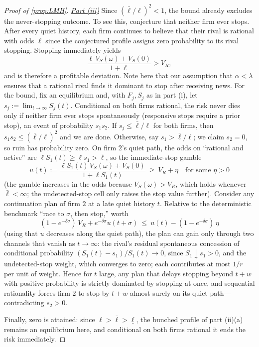 \documentclass[12pt,reqno]{article}
\theoremstyle{definition} \newtheorem{example}{Example}
\theoremstyle{definition} \newtheorem{condition}{Condition}
\theoremstyle{definition} \newtheorem{corollary}{Corollary}
\theoremstyle{definition} \newtheorem{claim}{Claim}
\theoremstyle{definition} \newtheorem{definition}{Definition}
\theoremstyle{definition} \newtheorem{conjecture}{Conjecture}
\theoremstyle{definition} \newtheorem{Lemma}{Lemma}
\theoremstyle{definition} \newtheorem{lemma}{Lemma}
\theoremstyle{plain} \newtheorem{theorem}{Theorem}
\theoremstyle{definition} \newtheorem{assumption}{Assumption}
\theoremstyle{definition} \newtheorem*{assumptionnonumber}{Assumption}
\theoremstyle{definition} \newtheorem*{theoremNoNumber}{Proposition}
\theoremstyle{definition}
\theoremstyle{definition}\newtheorem{proposition}{Proposition}
\theoremstyle{definition} \newtheorem{result}{Result}
\theoremstyle{definition} \newtheorem*{definitionNoNumber}{Definition}
\theoremstyle{definition} \newtheorem{Definition}{Definition}
\theoremstyle{definition} \newtheorem*{DefinitionNoNumber}{Definition}
\theoremstyle{definition} \newtheorem*{fact}{Fact}
\theoremstyle{definition} \newtheorem*{property}{Property}
\theoremstyle{definition} \newtheorem{remark}{Remark}
\begin{document}
\begin{proof}[Proof of \cref{prop:LMH}]
\noindent  \underline{\emph{Part (iii)}} Since $(\bar\ell/\ell)^2<1$, the bound already excludes the never-stopping outcome. To see this, conjecture that neither firm ever stops. After every quiet history, each firm continues to believe that their rival is rational with odds  $\ell$ since the conjectured profile assigns zero probability to its rival stopping. Stopping immediately yields
\[
\frac{\ell\,V_S(\omega)+V_S(0)}{1+\ell}>V_R,
\]
and is therefore a profitable deviation. Note here that our assumption that $\alpha<\lambda$ ensures that a rational rival finds it dominant to stop after receiving news. For the bound, fix an equilibrium and, with $F_j,S_j$ as in part (i), let $s_j:=\lim_{t\to\infty}S_j(t)$. Conditional on both firms rational, the risk never dies only if neither firm ever stops spontaneously (responsive stops require a prior stop), an event of probability $s_1s_2$. If $s_j\le\bar\ell/\ell$ for both firms, then $s_1s_2\le(\bar\ell/\ell)^2$ and we are done. Otherwise, say $s_1>\bar\ell/\ell$; we claim $s_2=0$, so ruin has probability zero. On firm $2$'s quiet path, the odds on ``rational and active'' are $\ell S_1(t)\ge\ell s_1>\bar\ell$, so the immediate-stop gamble
\[
u(t):=\frac{\ell S_1(t)\,V_S(\omega)+V_S(0)}{1+\ell S_1(t)}\ \ge\ V_R+\eta\quad\text{for some }\eta>0
\]
(the gamble increases in the odds because $V_S(\omega)>V_R$, which holds whenever $\bar\ell<\infty$; the undetected-stop cell only raises the stop value further). Consider any continuation plan of firm $2$ at a late quiet history $t$. Relative to the deterministic benchmark ``race to $\sigma$, then stop,'' worth
\[
(1-e^{-\delta\sigma})\,V_R+e^{-\delta\sigma}u(t+\sigma)\ \le\ u(t)-(1-e^{-\delta\sigma})\,\eta
\]
(using that $u$ decreases along the quiet path), the plan can gain only through two  channels that vanish as $t \to \infty$: the rival's residual spontaneous concession of conditional probability $(S_1(t)-s_1)/S_1(t)\to 0$, since $S_1\downarrow s_1>0$, and the undetected-stop weight, which converges  to zero; each contributes at most $1/r$ per unit of weight. Hence for $t$ large, any plan that delays stopping beyond $t+w$ with positive probability is strictly dominated by stopping at once, and sequential rationality forces firm $2$ to stop by $t+w$ almost surely on its quiet path---contradicting $s_2>0$.

Finally, zero is attained: since $\ell>\bar\ell>\underline\ell$, the bunched profile of part (ii)(a) remains an equilibrium here, and conditional on both firms rational it ends the risk immediately.
\end{proof}
\end{document}
